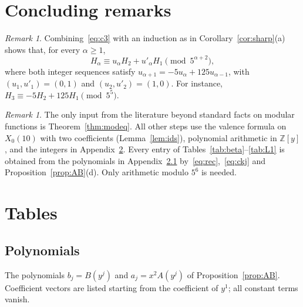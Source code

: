 \documentclass[11pt]{article}
\theoremstyle{definition}
\theoremstyle{remark}
\newtheorem{remark}[theorem]{Remark}
\numberwithin{equation}{section}
\newcommand{\Z}{\mathbb{Z}}
\begin{document}
\section{Concluding remarks}\label{sec:remarks}

\begin{remark}
Combining~\eqref{eq:c3} with an induction as in Corollary~\ref{cor:sharp}(a) shows that, for every $\alpha\ge1$,
\[
H_\alpha\equiv u_\alpha H_2+u'_\alpha H_1\pmod{5^{\alpha+2}},
\]
where both integer sequences satisfy $u_{\alpha+1}=-5u_\alpha+125u_{\alpha-1}$, with $(u_1,u'_1)=(0,1)$ and $(u_2,u'_2)=(1,0)$. For instance, $H_3\equiv-5H_2+125H_1\pmod{5^5}$.
\end{remark}

\begin{remark}
The only input from the literature beyond standard facts on modular functions is Theorem~\ref{thm:modeq}. All other steps use the valence formula on $X_0(10)$ with two coefficients (Lemma~\ref{lem:ids}), polynomial arithmetic in $\Z[y]$, and the integers in Appendix~\ref{app:tables}. Every entry of Tables~\ref{tab:beta}--\ref{tab:L1} is obtained from the polynomials in Appendix~\ref{app:poly} by~\eqref{eq:rec},~\eqref{eq:ckj} and Proposition~\ref{prop:AB}(d). Only arithmetic modulo $5^6$ is needed.
\end{remark}

\appendix
\section{Tables}\label{app:tables}

\subsection{Polynomials}\label{app:poly}
The polynomials $b_j=B(y^j)$ and $a_j=x^2A(y^j)$ of Proposition~\ref{prop:AB}. Coefficient vectors are listed starting from the coefficient of $y^1$; all constant terms vanish.
\end{document}
